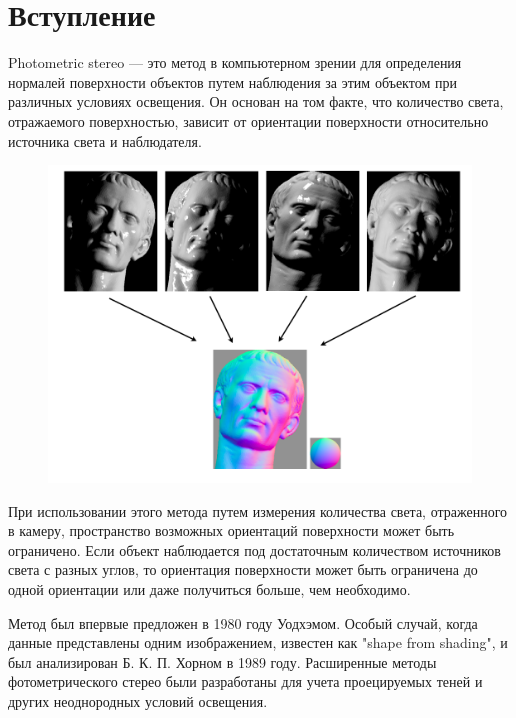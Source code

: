 \documentclass[12pt]{article}
\begin{document}


\newpage
\tableofcontents

\newpage

\section{Вступление}

Photometric stereo — это метод в компьютерном зрении для определения
нормалей поверхности объектов путем наблюдения за этим объектом
при различных условиях освещения. Он основан на том факте,
что количество света, отражаемого поверхностью, зависит от ориентации
поверхности относительно источника света и наблюдателя.

\begin{figure}[h]
  \centering
  \includegraphics[scale=0.3]{tex/example.png}
\end{figure}

При использовании этого метода путем измерения количества света,
отраженного в камеру, пространство возможных ориентаций поверхности может
быть ограничено. Если объект наблюдается под достаточным количеством источников
света с разных углов, то ориентация поверхности может быть ограничена
до одной ориентации или даже получиться больше, чем необходимо.

Метод был впервые предложен в 1980 году Уодхэмом. Особый случай,
когда данные представлены одним изображением, известен как "shape from shading",
и был анализирован Б. К. П. Хорном в 1989 году. Расширенные методы фотометрического
стерео были разработаны для учета проецируемых теней и других
неоднородных условий освещения.
\end{document}
